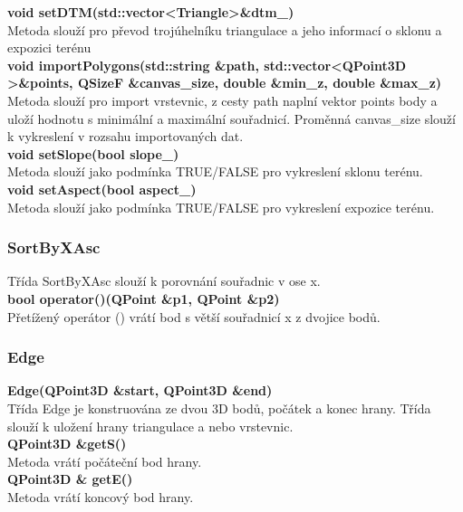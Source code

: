 \documentclass[a4paper, 12pt]{article}
\begin{document}
\textbf{void setDTM(std::vector\textless Triangle\textgreater \&dtm\_)}\\
Metoda slouží pro převod trojúhelníku triangulace a jeho informací o sklonu a expozici terénu\\

\textbf{void importPolygons(std::string \&path, std::vector\textless QPoint3D \textgreater \&points,  QSizeF \&canvas\_size, double \&min\_z, double \&max\_z)}\\
Metoda slouží pro import vrstevnic, z cesty path naplní vektor points body a uloží hodnotu s minimální a maximální souřadnicí. Proměnná canvas\_size slouží k vykreslení v rozsahu importovaných dat.\\

\textbf{void setSlope(bool slope\_)}\\
Metoda slouží jako podmínka TRUE/FALSE pro vykreslení sklonu terénu.\\

\textbf{void setAspect(bool aspect\_)}\\
Metoda slouží jako podmínka TRUE/FALSE pro vykreslení expozice terénu.\\



\subsubsection{SortByXAsc}
Třída SortByXAsc slouží k porovnání souřadnic v ose x.\\


\textbf{bool operator()(QPoint \&p1, QPoint \&p2)}\\
Přetížený operátor () vrátí bod s větší souřadnicí x z dvojice bodů.\\

\subsubsection{Edge}
\textbf{Edge(QPoint3D \&start, QPoint3D \&end)}\\
Třída Edge je konstruována ze dvou 3D bodů, počátek a konec hrany. Třída slouží k uložení hrany triangulace a nebo vrstevnic.\\
    
\textbf{QPoint3D \&getS()}\\
Metoda vrátí počáteční bod hrany.\\

\textbf{QPoint3D \& getE()}\\
Metoda vrátí koncový bod hrany.\\
\end{document}
